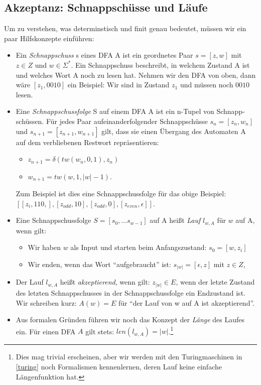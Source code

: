 \subsection{Akzeptanz: Schnappschüsse und Läufe}
Um zu verstehen, was determinstisch und finit genau bedeutet,
müssen wir ein paar Hilfskonzepte einführen:
\begin{itemize}
    \item Ein \emph{Schnappschuss} s eines DFA A ist ein geordnetes Paar $s = [z, w]$
        mit $z \in Z$ und $w \in \Sigma^*$.
        Ein Schnappschuss beschreibt,
        in welchem Zustand A ist und welches Wort A noch zu lesen hat.
        Nehmen wir den DFA von oben, dann wäre $[z_1,0010]$ ein Beispiel:
        Wir sind in Zustand $z_1$ und müssen noch $0010$ lesen.
    \item Eine \emph{Schnappschussfolge} S auf einem DFA A
        ist ein n-Tupel von Schnapp-schüssen. 
        Für jedes Paar aufeinanderfolgender Schnappschüsse $s_n = [z_n, w_n]$
        und $s_{n+1} = [z_{n+1}, w_{n+1}]$ gilt,
        dass sie einen Übergang des Automaten A auf dem verbliebenen Restwort repräsentieren:
        \begin{itemize}
            \item $z_{n+1} = \delta(tw(w_{n},0,1), z_n)$
            \item $w_{n+1} = tw(w,1,|w|-1)$.
        \end{itemize}
        Zum Beispiel ist dies eine Schnappschussfolge für das obige Beispiel:\linebreak
        $[[z_i,110,],[z_{odd},10],[z_{odd},0],[z_{even},\epsilon]]$.
    \item Eine Schnappschussfolge $S = [s_0, \ldots s_{w-1}]$ auf A
        heißt \emph{Lauf} $l_{w,A}$ für $w$ auf A, wenn gilt:
        \begin{itemize}
            \item Wir haben $w$ als Input und starten beim Anfangszustand:
                $s_0 = [w, z_i]$ 
            \item Wir enden, wenn das Wort ``aufgebraucht'' ist:
                $s_{|w|} = [\epsilon, z]$ mit $z \in Z$,

        \end{itemize}
    \item Der Lauf $l_{w,A}$ heißt \emph{akzeptierend}, wenn gilt:
        $z_{|w|} \in E$,
        wenn der letzte Zustand des letzten Schnappschusses in der Schnappschussfolge
        ein Endzustand ist.
        Wir schreiben kurz: $A(w) = E$
        für ``der Lauf von w auf A ist akzeptierend''. 
    \item Aus formalen Gründen führen wir noch das Konzept der \emph{Länge} des Laufes ein.
        Für einen DFA $A$ gilt stets: $len(l_{w,A}) = |w|$.\footnote{
        Dies mag trivial erscheinen,
        aber wir werden mit den Turingmaschinen in \autoref{turing} 
        noch Formalismen kennenlernen, deren Lauf keine einfache Längenfunktion hat.} 

\end{itemize}

